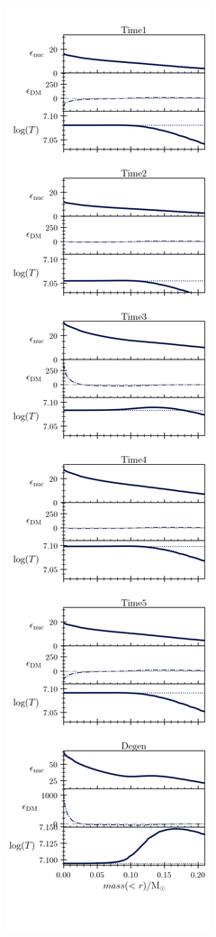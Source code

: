 \documentclass[useAMS,usenatbib]{mnras}
\begin{document}
  \begin{figure}
    \centering
    \includegraphics[width=\textwidth]{plots/m1p0c6.png}

\end{figure}
\end{document}
